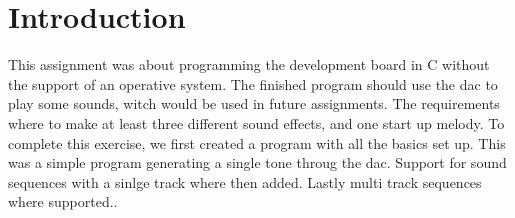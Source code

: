 \section{Introduction}
This assignment was about programming the development board in C without the support of an operative system. The finished program should use the dac to play some sounds, witch would be used in future assignments. The requirements where to make at least three different sound effects, and one start up melody. 
To complete this exercise, we first created a program with all the basics set up. This was a simple program generating a single tone throug the dac. Support for sound sequences with a sinlge track where then added. Lastly multi track sequences where supported..
